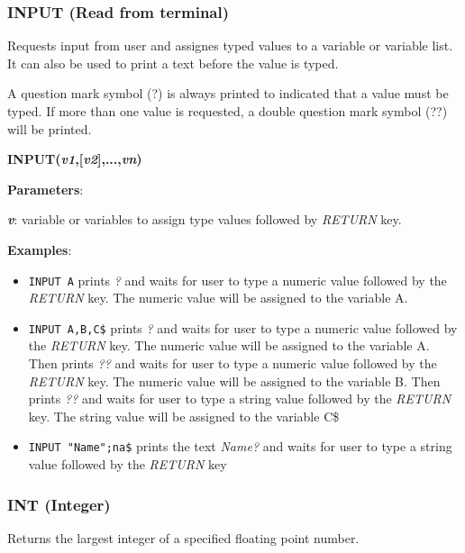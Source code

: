     \subsubsection{{INPUT (Read from terminal)}}
    \label{msbasic:lang:input}
    Requests input from user and assignes typed values to a variable or variable
    list. It can also be used to print a text before the value is typed.

    A question mark symbol (?) is always printed to indicated that a value must
    be typed. If more than one value is requested, a double question mark symbol
    (??) will be printed.

    \hspace{1.9cm}\textbf{INPUT(\textit{v1},[\textit{v2}],...,\textit{vn})}

    \textbf{Parameters}:

    \hspace{1cm}\textbf{\textit{v}}: variable or variables to assign type values
    followed by \textit{RETURN} key.

    \textbf{Examples}:
    \begin{itemize}
        \item \texttt{INPUT A} prints \textit{?} and waits for user to type a
        numeric value followed by the \textit{RETURN} key. The numeric value
        will be assigned to the variable A.
        \item \texttt{INPUT A,B,C\$} prints \textit{?} and waits for user to
        type a numeric value followed by the \textit{RETURN} key. The numeric
        value will be assigned to the variable A. Then prints \textit{??} and
        waits for user to type a numeric value followed by the \textit{RETURN}
        key. The numeric value will be assigned to the variable B. Then prints
        \textit{??} and waits for user to type a string value followed by the
        \textit{RETURN} key. The string  value will be assigned to the variable
        C\$
        \item \texttt{INPUT "Name";na\$} prints the text \textit{Name?} and
        waits for user to type a string value followed by the \textit{RETURN}
        key
    \end{itemize}

    \subsubsection{{INT (Integer)}}
    \label{msbasic:lang:int}
    Returns the largest integer of a specified floating point number.

